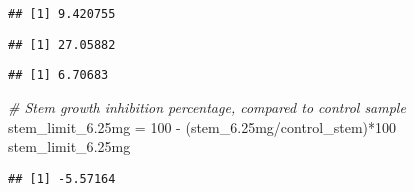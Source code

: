 \documentclass[
]{article}
\newenvironment{Shaded}{\begin{snugshade}}{\end{snugshade}}
\newcommand{\CommentTok}[1]{\textcolor[rgb]{0.56,0.35,0.01}{\textit{#1}}}
\newcommand{\DecValTok}[1]{\textcolor[rgb]{0.00,0.00,0.81}{#1}}
\newcommand{\FloatTok}[1]{\textcolor[rgb]{0.00,0.00,0.81}{#1}}
\newcommand{\FunctionTok}[1]{\textcolor[rgb]{0.00,0.00,0.00}{#1}}
\newcommand{\NormalTok}[1]{#1}
\newcommand{\OtherTok}[1]{\textcolor[rgb]{0.56,0.35,0.01}{#1}}
\newcommand{\SpecialCharTok}[1]{\textcolor[rgb]{0.00,0.00,0.00}{#1}}
\begin{document}
\begin{verbatim}
## [1] 9.420755
\end{verbatim}

\begin{Shaded}
\end{Shaded}

\begin{verbatim}
## [1] 27.05882
\end{verbatim}

\begin{Shaded}
\end{Shaded}

\begin{verbatim}
## [1] 6.70683
\end{verbatim}

\begin{Shaded}
\begin{Highlighting}[]
\CommentTok{\# Stem growth inhibition percentage, compared to control sample}
\NormalTok{stem\_limit\_6}\FloatTok{.25}\NormalTok{mg }\OtherTok{=} \DecValTok{100} \SpecialCharTok{{-}}\NormalTok{ (stem\_6}\FloatTok{.25}\NormalTok{mg}\SpecialCharTok{/}\NormalTok{control\_stem)}\SpecialCharTok{*}\DecValTok{100}
\NormalTok{stem\_limit\_6}\FloatTok{.25}\NormalTok{mg}
\end{Highlighting}
\end{Shaded}

\begin{verbatim}
## [1] -5.57164
\end{verbatim}

\begin{Shaded}
\end{Shaded}
\end{document}
